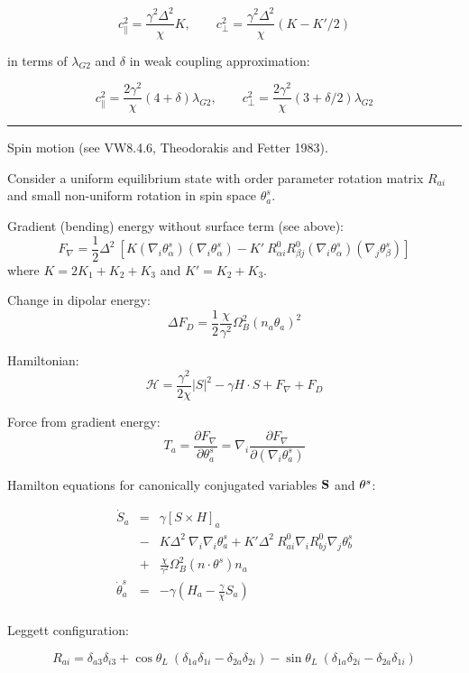 \documentclass[a4paper]{article}
\begin{document}
$$
c_\parallel^2 = \frac{\gamma^2 \Delta^2}{\chi} K,\qquad
c_\perp^2 = \frac{\gamma^2 \Delta^2}{\chi} (K-K'/2)
$$

in terms of $\lambda_{G2}$ and $\delta$ in weak coupling approximation:

$$
c_\parallel^2 = \frac{2\gamma^2}{\chi} (4+\delta)\lambda_{G2},\qquad
c_\perp^2     = \frac{2\gamma^2}{\chi} (3+\delta/2)\lambda_{G2}
$$


\eject
\hrule
\medskip

Spin motion (see VW8.4.6, Theodorakis and Fetter 1983).

Consider a uniform equilibrium state with order parameter rotation matrix $R_{ai}$
and small non-uniform rotation in spin space $\theta^s_a$.

Gradient (bending) energy without surface term (see above):
$$
F_\nabla = \frac12 \Delta^2\ [
K (\nabla_i\theta^s_\alpha) (\nabla_i\theta^s_\alpha)
- K'\ R^0_{\alpha i}R^0_{\beta j}(\nabla_i\theta^s_\alpha)(\nabla_j\theta^s_\beta)]
$$
where $K=2K_1+K_2+K_3$ and $K'=K_2+K_3$.

Change in dipolar energy:
$$
\Delta F_D = \frac12 \frac{\chi}{\gamma^2}\Omega_B^2 (n_a \theta_a)^2
$$

Hamiltonian:
$$
\mathcal{H} = \frac{\gamma^2}{2\chi} |S|^2 - \gamma H \cdot S + F_\nabla +  F_D
$$

Force from gradient energy:
$$
T_a = \frac{\partial F_\nabla}{\partial\theta_a^s}
= \nabla_i \frac{\partial F_\nabla}{\partial(\nabla_i\theta_a^s)}
$$

Hamilton equations for canonically conjugated variables $\bf S$ and
${\bf \theta}^s$:

\begin{eqnarray*}
\dot S_a
&=& \gamma [S\times H]_a\\
&-& K\Delta^2\ \nabla_i\nabla_i \theta_a^s
 + K'\Delta^2\ R^0_{ai}\nabla_i R^0_{bj}\nabla_j\theta_b^s\\
&+& \frac{\chi}{\gamma^2}\Omega_B^2 (n\cdot\theta^s) n_a\\
\dot \theta_a^s &=& -\gamma \left(H_a-\frac{\gamma}{\chi} S_a\right)\\
\end{eqnarray*}

Leggett configuration:

$$
R_{ai} =
\delta_{a3}\delta_{i3}
+ \cos\theta_L\ (\delta_{1a}\delta_{1i}-\delta_{2a}\delta_{2i})
- \sin\theta_L\ (\delta_{1a}\delta_{2i}-\delta_{2a}\delta_{1i})
$$
\end{document}
